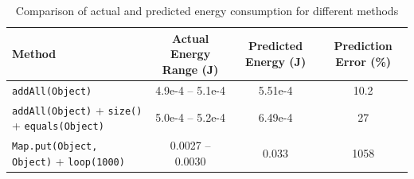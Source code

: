 \begin{table}[htbp]
  \centering
  \label{tab:energy_comparison}
  \footnotesize
  \begin{tabular}{>{\raggedright\arraybackslash}p{4cm}ccc}
    \toprule
    Method & Actual Energy Range (J) & Predicted Energy (J) & Prediction Error (\%) \\
    \midrule
    \texttt{addAll(Object)} & 4.9e-4 -- 5.1e-4 & 5.51e-4 & 10.2 \\
    \midrule
    \texttt{addAll(Object)} + \texttt{size()} + \texttt{equals(Object)} & 5.0e-4 -- 5.2e-4 & 6.49e-4 & 27 \\
    \midrule
    \texttt{Map.put(Object, Object)} + \texttt{loop(1000)} & 0.0027 -- 0.0030 & 0.033 &  1058 \\
    \bottomrule
  \end{tabular}
  \vspace{0.5em}
  \caption{Comparison of actual and predicted energy consumption for different methods}
\end{table}


